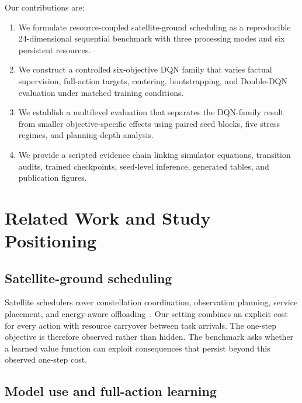 \documentclass[11pt]{article}
\begin{document}
Our contributions are:

\begin{enumerate}[leftmargin=1.6em]
\color{red}%
    \item We formulate resource-coupled satellite-ground scheduling as a reproducible 24-dimensional sequential benchmark with three processing modes and six persistent resources.
    \item We construct a controlled six-objective DQN family that varies factual supervision, full-action targets, centering, bootstrapping, and Double-DQN evaluation under matched training conditions.
    \item We establish a multilevel evaluation that separates the DQN-family result from smaller objective-specific effects using paired seed blocks, five stress regimes, and planning-depth analysis.
    \item We provide a scripted evidence chain linking simulator equations, transition audits, trained checkpoints, seed-level inference, generated tables, and publication figures.
\color{black}%
\end{enumerate}

\color{red}%
\section{Related Work and Study Positioning}
\color{black}%

\subsection{Satellite-ground scheduling}

\color{red}%
Satellite schedulers cover constellation coordination, observation planning, service placement, and energy-aware offloading~\cite{RN8,RN10,RN20,RN22,RN23,RN27,RN28}. Our setting combines an explicit cost for every action with resource carryover between task arrivals. The one-step objective is therefore observed rather than hidden. The benchmark asks whether a learned value function can exploit consequences that persist beyond this observed one-step cost.
\color{black}%

\color{red}%
\subsection{Model use and full-action learning}
\color{black}%
\end{document}

